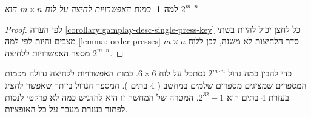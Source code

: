 \documentclass[12pt,leqno]{article}
\theoremstyle{theoremdd}
\newtheorem{lemma}{למה}[section]
\begin{document}
\begin{lemma}
    \label{lemma: num presses}
    כמות האפשרויות לחיצה על לוח
    $m \times n$
    הוא 
    $2^{m \cdot n}$
\end{lemma}
\begin{proof}
    לפי הערה 
\ref{corollary:gamplay-desc-single-press-key}
כל לחצן יכול להיות בשתי מצבים 
והיות לפי
למה
\ref{lemma: order presses}
סדר הלחיצות לא משנה,
לכן ללוח
$m \times n$
מספר האפשרויות ללחיצה 
$2^{m \cdot n}$.
\end{proof}
כדי להבין כמה גדול
$2^{m \cdot n}$
נסתכל על לוח 
$6 \times 6$.
כמות האפשרויות ללחיצה גדולה 
מכמות המספרים שמציגים מספרים שלמים במחשב
(
$4$
בתים
).
המספר הגדול ביותר שאפשר להציג בעזרת 
$4$
בתים
הוא
$2^{32}-1$.
המטרה של המחשה זו היא להדגיש כמה לא פרקטי לנסות לפתור בעזרת
מעבר על כל האופציות.
\end{document}
